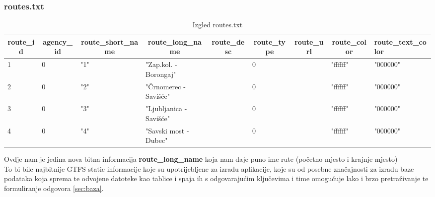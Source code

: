 \documentclass[zavrsnirad]{fer}
\begin{document}
\subsubsection{routes.txt}

\begin{table}[htb]
	\begin{adjustbox}{width=\columnwidth,center}
	\begin{tabular}{l|l|l|l|l|l|l|l|l}
		\hline
		\multicolumn{1}{c|}{\textbf{route\_id}} & \multicolumn{1}{c|}{\textbf{agency\_id}} & \multicolumn{1}{c|}{\textbf{route\_short\_name}} & \multicolumn{1}{c|}{\textbf{route\_long\_name}} & \multicolumn{1}{c|}{\textbf{route\_desc}} & \multicolumn{1}{c|}{\textbf{route\_type}} & \multicolumn{1}{c|}{\textbf{route\_url}} & \multicolumn{1}{c|}{\textbf{route\_color}} & \textbf{route\_text\_color} \\ \hline
		1 & 0 & "1" & "Zap.kol. - Borongaj" &  & 0 &  & "ffffff" & "000000" \\ \hline
		2 & 0 & "2" & "Črnomerec - Savišće" &  & 0 &  & "ffffff" & "000000" \\ \hline
		3 & 0 & "3" & "Ljubljanica -Savišće" &  & 0 &  & "ffffff" & "000000" \\ \hline
		4 & 0 & "4" & "Savski most - Dubec" &  & 0 &  & "ffffff" & "000000" \\ \hline
	\end{tabular}
	\end{adjustbox}
	\caption{Izgled routes.txt}
	\label{tbl:routes}
\end{table}

Ovdje nam je jedina nova bitna informacija \textbf{route\_long\_name} koja nam daje puno ime rute (početno mjesto i krajnje mjesto)\\
To bi bile najbitnije GTFS static informacije koje su upotrijebljene za izradu aplikacije, koje su od posebne značajnosti za izradu baze podataka koja sprema te odvojene datoteke kao tablice i spaja ih s odgovarajućim ključevima i time omogućuje lako i brzo pretraživanje te formuliranje odgovora \ref{sec:baza}.

\newpage
\end{document}
